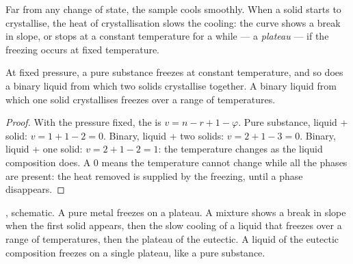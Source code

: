 Far from any change of state, the sample cools smoothly. When a solid starts to
crystallise, the heat of crystallisation slows the cooling: the curve shows a
break in slope, or stops at a constant temperature for a while --- a
\textit{plateau} --- if the freezing occurs at fixed temperature.

\begin{proposition}[Plateaus]\label{prop:b2:solid-liquid-diagrams:plateaus}
At fixed pressure, a pure substance freezes at constant temperature, and so
does a binary liquid from which two solids crystallise together. A binary
liquid from which one solid crystallises freezes over a range of temperatures.
\end{proposition}

\begin{proof}
With the pressure fixed, the  is $v = n - r + 1 - \varphi$. Pure
substance, liquid + solid: $v = 1 + 1 - 2 = 0$. Binary, liquid + two solids:
$v = 2 + 1 - 3 = 0$. Binary, liquid + one solid: $v = 2 + 1 - 2 = 1$: the
temperature changes as the liquid composition does. A  0 means the
temperature cannot change while all the phases are present: the heat removed is
supplied by the freezing, until a phase disappears.
\end{proof}

\begin{omfigure}

{\small {}, schematic. A pure metal freezes on a plateau. A
mixture shows a break in slope when the first solid appears, then the slow
cooling of a liquid that freezes over a range of temperatures, then the
plateau of the eutectic. A liquid of the eutectic composition freezes on a
single plateau, like a pure substance.}
\end{omfigure}

